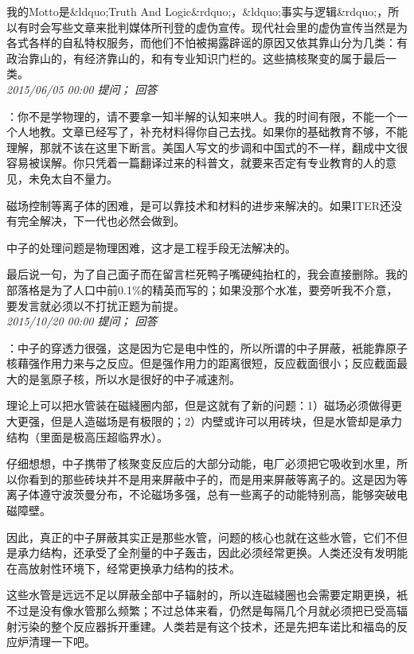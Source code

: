 \documentclass[twocolumn]{ctexart}
\begin{document}
我的Motto是\&ldquo;Truth And Logic\&rdquo;，\&ldquo;事实与逻辑\&rdquo;，所以有时会写些文章来批判媒体所刊登的虚伪宣传。现代社会里的虚伪宣传当然是为各式各样的自私特权服务，而他们不怕被揭露辟谣的原因又依其靠山分为几类：有政治靠山的，有经济靠山的，和有专业知识门栏的。这些搞核聚变的属于最后一类。\\

\textit{\hfill\noindent\small 2015/06/05 00:00 提问； 回答}

：你不是学物理的，请不要拿一知半解的认知来哄人。我的时间有限，不能一个一个人地教。文章已经写了，补充材料得你自己去找。如果你的基础教育不够，不能理解，那就不该在这里下断言。美国人写文的步调和中国式的不一样，翻成中文很容易被误解。你只凭着一篇翻译过来的科普文，就要来否定有专业教育的人的意见，未免太自不量力。

磁场控制等离子体的困难，是可以靠技术和材料的进步来解决的。如果ITER还没有完全解决，下一代也必然会做到。

中子的处理问题是物理困难，这才是工程手段无法解决的。

最后说一句，为了自己面子而在留言栏死鸭子嘴硬纯抬杠的，我会直接删除。我的部落格是为了人口中前0.1\%的精英而写的；如果没那个水准，要旁听我不介意，要发言就必须以不打扰正题为前提。\\

\textit{\hfill\noindent\small 2015/10/20 00:00 提问； 回答}

：中子的穿透力很强，这是因为它是电中性的，所以所谓的中子屏蔽，衹能靠原子核藉强作用力来与之反应。但是强作用力的距离很短，反应截面很小；反应截面最大的是氢原子核，所以水是很好的中子减速剂。

理论上可以把水管装在磁綫圈内部，但是这就有了新的问题：1）磁场必须做得更大更强，但是人造磁场是有极限的；2）内壁或许可以用砖块，但是水管却是承力结构（里面是极高压超临界水）。

仔细想想，中子携带了核聚变反应后的大部分动能，电厂必须把它吸收到水里，所以你看到的那些砖块并不是用来屏蔽中子的，而是用来屏蔽等离子的。这是因为等离子体遵守波茨曼分布，不论磁场多强，总有一些离子的动能特别高，能够突破电磁障壁。

因此，真正的中子屏蔽其实正是那些水管，问题的核心也就在这些水管，它们不但是承力结构，还承受了全剂量的中子轰击，因此必须经常更换。人类还没有发明能在高放射性环境下，经常更换承力结构的技术。

这些水管是远远不足以屏蔽全部中子辐射的，所以连磁綫圈也会需要定期更换，衹不过是没有像水管那么频繁；不过总体来看，仍然是每隔几个月就必须把已受高辐射污染的整个反应器拆开重建。人类若是有这个技术，还是先把车诺比和福岛的反应炉清理一下吧。
\end{document}
